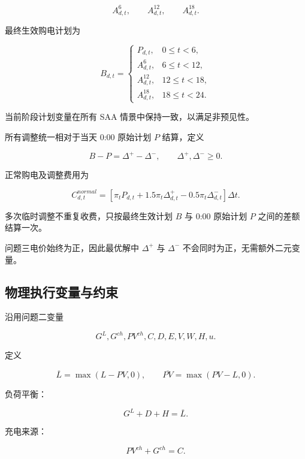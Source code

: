 \begin{equation}
A^6_{d,t},
\qquad
A^{12}_{d,t},
\qquad
A^{18}_{d,t}.
\end{equation}

最终生效购电计划为

\begin{equation}
B_{d,t}
=
\begin{cases}
P_{d,t},&0\le t<6,\\
A^6_{d,t},&6\le t<12,\\
A^{12}_{d,t},&12\le t<18,\\
A^{18}_{d,t},&18\le t<24.
\end{cases}
\end{equation}

当前阶段计划变量在所有 SAA 情景中保持一致，以满足非预见性。

所有调整统一相对于当天 0:00 原始计划 \(P\) 结算，定义

\begin{equation}
B-P=\Delta^+-\Delta^-,
\qquad
\Delta^+,\Delta^-\ge0.
\end{equation}

正常购电及调整费用为

\begin{equation}
C^{normal}_{d,t}
=
\left[
\pi_tP_{d,t}
+
1.5\pi_t\Delta^+_{d,t}
-
0.5\pi_t\Delta^-_{d,t}
\right]\Delta t.
\end{equation}

多次临时调整不重复收费，只按最终生效计划 \(B\) 与 0:00 原始计划 \(P\) 之间的差额结算一次。

问题三电价始终为正，因此最优解中 \(\Delta^+\) 与 \(\Delta^-\) 不会同时为正，无需额外二元变量。

\subsection{物理执行变量与约束}

沿用问题二变量

\[
G^L,G^{ch},PV^{ch},C,D,E,V,W,H,u.
\]

定义

\[
\overline L=\max(L-PV,0),
\qquad
\overline{PV}=\max(PV-L,0).
\]

负荷平衡：

\begin{equation}
G^L+D+H=\overline L.
\end{equation}

充电来源：

\begin{equation}
PV^{ch}+G^{ch}=C.
\end{equation}

